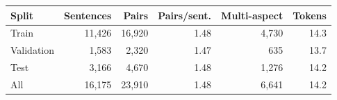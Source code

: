 \begin{tabular}{lrrrrr}
\toprule
Split & Sentences & Pairs & Pairs/sent. & Multi-aspect & Tokens \\
\midrule
Train & 11,426 & 16,920 & 1.48 & 4,730 & 14.3 \\
Validation & 1,583 & 2,320 & 1.47 & 635 & 13.7 \\
Test & 3,166 & 4,670 & 1.48 & 1,276 & 14.2 \\
All & 16,175 & 23,910 & 1.48 & 6,641 & 14.2 \\
\bottomrule
\end{tabular}
